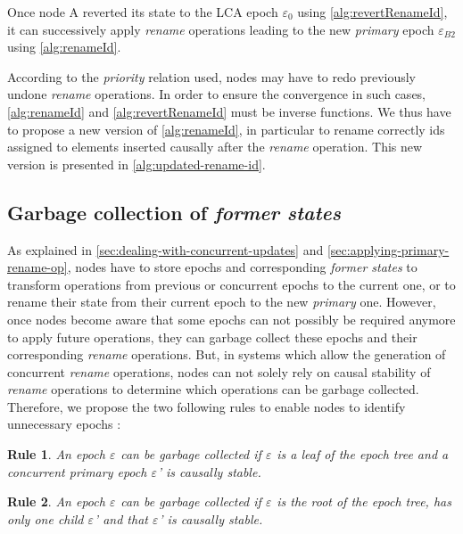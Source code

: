 \documentclass[10pt,journal,compsoc]{IEEEtran}
\newtheorem{myrule}{Rule}
\newcommand{\epoch}[1]{$\varepsilon_{#1}$}
\begin{document}
Once node A reverted its state to the LCA epoch \epoch{0} using \autoref{alg:revertRenameId}, it can successively apply \emph{rename} operations leading to the new \emph{primary} epoch \epoch{B2} using \autoref{alg:renameId}.

According to the \emph{priority} relation used, nodes may have to redo previously undone \emph{rename} operations.
In order to ensure the convergence in such cases, \autoref{alg:renameId} and \autoref{alg:revertRenameId} must be inverse functions.
We thus have to propose a new version of \autoref{alg:renameId}, in particular to rename correctly ids assigned to elements inserted causally after the \emph{rename} operation.
This new version is presented in \autoref{alg:updated-rename-id}.

\subsection{Garbage collection of \emph{former states}}

As explained in \autoref{sec:dealing-with-concurrent-updates} and \autoref{sec:applying-primary-rename-op}, nodes have to store epochs and corresponding \emph{former states} to transform operations from previous or concurrent epochs to the current one, or to rename their state from their current epoch to the new \emph{primary} one.
However, once nodes become aware that some epochs can not possibly be required anymore to apply future operations, they can garbage collect these epochs and their corresponding \emph{rename} operations.
But, in systems which allow the generation of concurrent \emph{rename} operations, nodes can not solely rely on causal stability of \emph{rename} operations to determine which operations can be garbage collected.
Therefore, we propose the two following rules to enable nodes to identify unnecessary epochs :

\begin{myrule}
    \label{rule:gc-concurrent-primary-epoch}
    An epoch \epoch{} can be garbage collected if \epoch{} is a leaf of the epoch tree and a concurrent primary epoch \epoch{}' is causally stable.
\end{myrule}

\begin{myrule}
    \label{rule:gc-root}
    An epoch \epoch{} can be garbage collected if \epoch{} is the root of the epoch tree, has only one child \epoch{}' and that \epoch{}' is causally stable.
\end{myrule}
\end{document}
